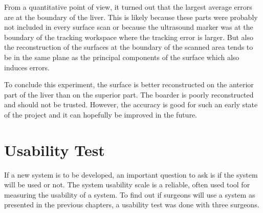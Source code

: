 From a quantitative point of view, it turned out that the largest average errors
are at the boundary of the liver. This is likely because these parts were
probably not included in every surface scan or because the ultrasound marker was
at the boundary of the tracking workspace where the tracking error is larger.
But also the reconstruction of the surfaces at the boundary of the scanned area
tends to be in the same plane as the principal components of the surface which
also induces errors.

To conclude this experiment, the surface is better reconstructed on the anterior
part of the liver than on the superior part. The boarder is poorly reconstructed and should
not be trusted. However, the accuracy is good for such an early state of the
project and it can hopefully be improved in the future.


\section{Usability Test}
If a new system is to be developed, an important question to ask is if the
system will be used or not.
The system usability scale is a reliable, often used tool for measuring the
usability of a system. 
To find out if surgeons will use a system as presented in the previous chapters,
a usability test was done with three surgeons.
